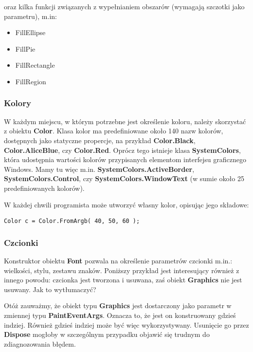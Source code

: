 oraz kilka funkcji związanych z wypełnianiem obszarów (wymagają szczotki jako parametru), m.in:

\begin{itemize}
\item FillEllipse
\item FillPie
\item FillRectangle
\item FillRegion
\end{itemize}

\subsubsection{Kolory}

W każdym miejscu, w którym potrzebne jest określenie koloru, należy skorzystać z obiektu {\bf Color}.
Klasa kolor ma predefiniowane około 140 nazw kolorów, dostępnych jako statyczne propercje, na przykład
{\bf Color.Black}, {\bf Color.AliceBlue}, czy {\bf Color.Red}. Oprócz tego istnieje klasa
{\bf SystemColors}, która udostępnia wartości kolorów przypisanych elementom interfejsu graficznego
Windows. Mamy tu więc m.in. {\bf SystemColors.ActiveBorder}, {\bf SystemColors.Control}, 
czy {\bf SystemColors.WindowText} (w sumie około 25 predefiniowanych kolorów).

W każdej chwili programista może utworzyć własny kolor, opisując jego składowe:

\begin{scriptsize}
\begin{verbatim}
Color c = Color.FromArgb( 40, 50, 60 );
\end{verbatim}
\end{scriptsize}

\subsubsection{Czcionki}

Konstruktor obiektu {\bf Font} pozwala na określenie parametrów czcionki m.in.: 
wielkości, stylu, zestawu znaków. Poniższy przykład jest interesujący również z innego powodu:
czcionka jest tworzona i usuwana, zaś obiekt {\bf Graphics} nie jest usuwany. Jak to wytłumaczyć?

Otóż zauważmy, że obiekt typu {\bf Graphics} jest dostarczony jako parametr w zmiennej typu 
{\bf PaintEventArgs}. Oznacza to, że jest on konstruowany gdzieś indziej. Również gdzieś indziej może
być więc wykorzystywany. Usunięcie go przez {\bf Dispose} mogłoby w szczególnym przypadku objawić się
trudnym do zdiagnozowania błędem.

